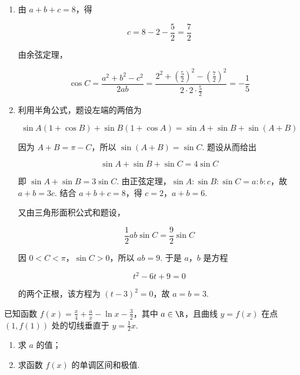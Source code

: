 \begin{solution}
\begin{enumerate}
\item 由 \(a+b+c=8\)，得

\[
c=8-2-\frac52=\frac72
\]

由余弦定理，

\[
\cos C=\frac{a^2+b^2-c^2}{2ab}
=\frac{2^2+\left(\frac52\right)^2-\left(\frac72\right)^2}{2\cdot2\cdot\frac52}
=-\frac15
\]

\item 利用半角公式，题设左端的两倍为

\[
\sin A(1+\cos B)+\sin B(1+\cos A)
=\sin A+\sin B+\sin(A+B)
\]

因为 \(A+B=\pi-C\)，所以 \(\sin(A+B)=\sin C\). 题设从而给出

\[
\sin A+\sin B+\sin C=4\sin C
\]

即 \(\sin A+\sin B=3\sin C\). 由正弦定理，\(\sin A:\sin B:\sin C=a:b:c\)，故 \(a+b=3c\). 结合 \(a+b+c=8\)，得 \(c=2\)，\(a+b=6\).

又由三角形面积公式和题设，

\[
\frac12ab\sin C=\frac92\sin C
\]

因 \(0<C<\pi\)，\(\sin C>0\)，所以 \(ab=9\). 于是 \(a\)，\(b\) 是方程

\[
t^2-6t+9=0
\]

的两个正根，该方程为 \((t-3)^2=0\)，故 \(a=b=3\).
\end{enumerate}
\end{solution}

\begin{problem}
已知函数 \( f(x) = \frac{x}{4} + \frac{a}{x} - \ln x - \frac{3}{2} \)，其中 \( a \in \R \)，且曲线 \( y = f(x) \) 在点 \( (1, f(1)) \) 处的切线垂直于 \( y = \frac{1}{2} x \).

\begin{enumerate}
\item 求 \(a\) 的值；
\item 求函数 \( f(x) \) 的单调区间和极值.
\end{enumerate}
\end{problem}

